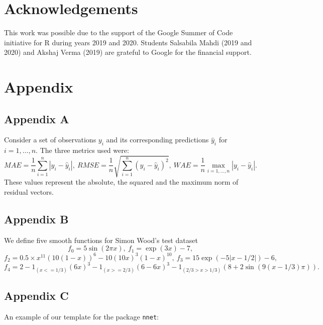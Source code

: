 \hypertarget{acknowledgements}{%
\section{Acknowledgements}\label{acknowledgements}}

This work was possible due to the support of the Google Summer of Code
initiative for R during years 2019 and 2020. Students Salsabila Mahdi
(2019 and 2020) and Akshaj Verma (2019) are grateful to Google for the
financial support.



\hypertarget{appendix}{%
\section{Appendix}\label{appendix}}

\hypertarget{appendix-a}{%
\subsection{Appendix A}\label{appendix-a}}

Consider a set of observations \(y_i\) and its corresponding predictions
\(\hat y_i\) for \(i=1,\dots,n\). The three metrics used were: \[
MAE = \frac1n\sum_{i=1}^n|y_i - \hat y_i|,~
RMSE = \frac1n\sqrt{\sum_{i=1}^n(y_i - \hat y_i)^2},~
WAE = \frac1n\max_{i=1,\dots,n}|y_i - \hat y_i|.
\] These values represent the absolute, the squared and the maximum norm
of residual vectors.

\hypertarget{appendix-b}{%
\subsection{Appendix B}\label{appendix-b}}

We define five smooth functions for Simon Wood's test dataset \[
f_0=5\sin(2\pi x),~
f_1=\exp(3x)-7,
\] \[
f_2=0.5\times x^{11}(10(1 - x))^6 - 10 (10x)^3(1 - x)^{10},~
f_3=15 \exp(-5 |x-1/2|)-6,
\] \[
f_4=2-1_{(x <= 1/3)}(6x)^3 - 1_{(x >= 2/3)} (6-6x)^3 - 
1_{(2/3 > x > 1/3)}(8+2\sin(9(x-1/3)\pi)).
\]

\hypertarget{appendix-c}{%
\subsection{Appendix C}\label{appendix-c}}

An example of our template for the package \texttt{nnet}:

